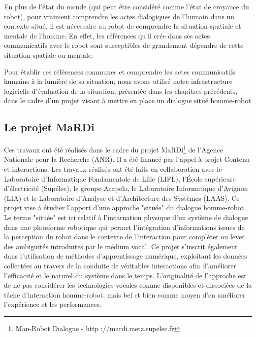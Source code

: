 \documentclass[a4paper,11pt,twoside]{StyleThese}
\begin{document}
En plus de l'état du monde (qui peut être considéré comme l'état de croyance du robot), pour vraiment comprendre les actes dialogiques de l'humain dans un contexte situé, il est nécessaire au robot de comprendre la situation spatiale et mentale de l'homme. En effet, les références qu'il crée dans ses actes communicatifs avec le robot sont susceptibles de grandement dépendre de cette situation spatiale ou mentale.

Pour établir ces références communes et comprendre les actes communicatifs humains à la lumière de sa situation, nous avons utilisé notre infrastructure logicielle d'évaluation de la situation, présentée dans les chapitres précédents, dans le cadre d'un projet visant à mettre en place un dialogue situé homme-robot


\subsection{Le projet MaRDi}
Ces travaux ont été réalisés dans le cadre du projet MaRDi\footnote{Man-Robot Dialogue - http ://mardi.metz.supelec.fr
} de l’Agence Nationale pour la Recherche (ANR). Il a été financé par l’appel à projet Contenu et interactions. Les
travaux réalisés ont été faits en collaboration avec le Laboratoire d’Informatique Fondamentale de Lille (LIFL), l’École supérieure d’électricité (Supélec), le groupe Acapela, le Laboratoire Informatique d’Avignon (LIA) et le Laboratoire d’Analyse et d’Architecture des Systèmes (LAAS).
Ce projet vise à étudier l’apport d’une approche "située" du dialogue homme-robot. Le terme "située" est ici relatif à l’incarnation physique d’un système de dialogue dans une plateforme robotique qui permet l’intégration d’informations issues de la perception du robot dans le contexte de l’interaction pour compléter ou lever des ambiguïtés introduites par le médium vocal. Ce projet s’inscrit également dans l’utilisation de méthodes d’apprentissage numérique, exploitant les données collectées au travers de la conduite de véritables interactions afin d’améliorer l’efficacité et le naturel du système dans le temps. L’originalité de l’approche est de ne pas considérer les technologies vocales comme disponibles et dissociées de la tâche d’interaction homme-robot, mais bel et bien comme moyen d’en améliorer l’expérience et les performances.
\end{document}
